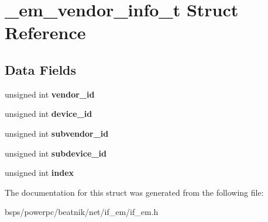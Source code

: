 \hypertarget{struct__em__vendor__info__t}{}\section{\+\_\+em\+\_\+vendor\+\_\+info\+\_\+t Struct Reference}
\label{struct__em__vendor__info__t}
\subsection*{Data Fields}
\begin{DoxyCompactItemize}
\item 
\mbox{\label{struct__em__vendor__info__t_afc84df239c1963008e430b360309d9ae}} 
unsigned int {\bfseries vendor\+\_\+id}
\item 
\mbox{\label{struct__em__vendor__info__t_a14285bb7ed9949f9ccc76766bd89f9ac}} 
unsigned int {\bfseries device\+\_\+id}
\item 
\mbox{\label{struct__em__vendor__info__t_a140da395056a52c508cad48ba1fd99f6}} 
unsigned int {\bfseries subvendor\+\_\+id}
\item 
\mbox{\label{struct__em__vendor__info__t_a567cee498aa2ecc0da8c70e9a38562cd}} 
unsigned int {\bfseries subdevice\+\_\+id}
\item 
\mbox{\label{struct__em__vendor__info__t_ad9a8b585ccddc29b03e84c33b8c8138b}} 
unsigned int {\bfseries index}
\end{DoxyCompactItemize}


The documentation for this struct was generated from the following file\+:\begin{DoxyCompactItemize}
\item 
bsps/powerpc/beatnik/net/if\+\_\+em/if\+\_\+em.\+h\end{DoxyCompactItemize}
